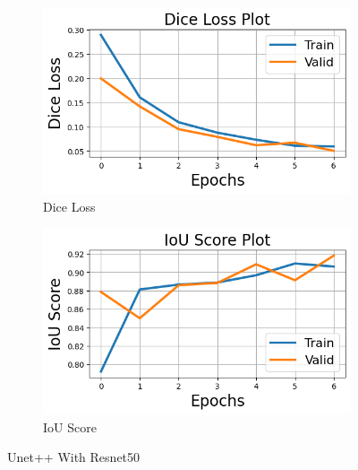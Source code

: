 \documentclass[12pt]{article}
\begin{document}
\begin{figure}[H]
  \begin{subfigure}[b]{0.5\textwidth}
    \includegraphics[width=\textwidth]{Figs/unet++withresnetdice.png}
    \caption{Dice Loss}
    \label{fig:f1}
  \end{subfigure}
  \hfill
  \begin{subfigure}[b]{0.5\textwidth}
    \includegraphics[width=\textwidth]{Figs/unet++withresnetiou.png}
    \caption{IoU Score}
    \label{fig:f2}
  \end{subfigure}
  \caption{Unet++ With Resnet50}
\end{figure}
\end{document}

